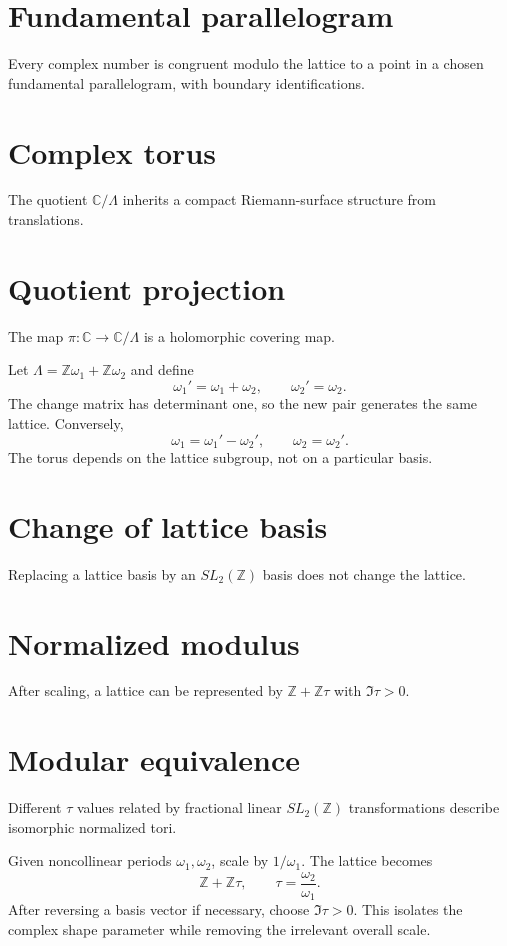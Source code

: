 \section{Fundamental parallelogram}
Every complex number is congruent modulo the lattice to a point in a chosen fundamental parallelogram, with boundary identifications.

\section{Complex torus}
The quotient $\mathbb C/\Lambda$ inherits a compact Riemann-surface structure from translations.

\section{Quotient projection}
The map $\pi:\mathbb C\to\mathbb C/\Lambda$ is a holomorphic covering map.

\begin{example}\label{ex:iv27-expand-02}
Let \(\Lambda=\mathbb Z\omega_1+\mathbb Z\omega_2\) and define
\[
\omega_1'=\omega_1+\omega_2,\qquad \omega_2'=\omega_2.
\]
The change matrix has determinant one, so the new pair generates the same lattice. Conversely,
\[
\omega_1=\omega_1'-\omega_2',\qquad \omega_2=\omega_2'.
\]
The torus depends on the lattice subgroup, not on a particular basis.
\end{example}
\section{Change of lattice basis}
Replacing a lattice basis by an $SL_2(\mathbb Z)$ basis does not change the lattice.

\section{Normalized modulus}
After scaling, a lattice can be represented by $\mathbb Z+\mathbb Z\tau$ with $\Im\tau>0$.

\section{Modular equivalence}
Different $\tau$ values related by fractional linear $SL_2(\mathbb Z)$ transformations describe isomorphic normalized tori.

\begin{example}\label{ex:iv27-expand-03}
Given noncollinear periods \(\omega_1,\omega_2\), scale by \(1/\omega_1\). The lattice becomes
\[
\mathbb Z+\mathbb Z\tau,\qquad \tau=\frac{\omega_2}{\omega_1}.
\]
After reversing a basis vector if necessary, choose \(\Im\tau>0\). This isolates the complex shape parameter while removing the irrelevant overall scale.
\end{example}
